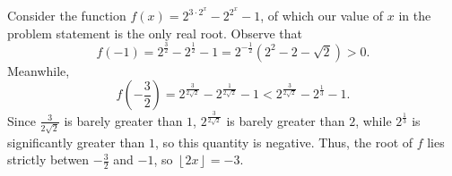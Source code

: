 Consider the function $f\left(x\right)=2^{3\cdot2^x}-2^{2^x}-1$, of which our value of $x$ in the problem statement is the only real root. Observe that \[f\left(-1\right)=2^{\frac{3}{2}}-2^{\frac{1}{2}}-1=2^{-\frac{1}{2}}\left(2^2-2-\sqrt{2}\right)>0.\] Meanwhile, \[f\left(-\frac{3}{2}\right)=2^{\frac{3}{2\sqrt{2}}}-2^{\frac{1}{2\sqrt{2}}}-1<2^{\frac{3}{2\sqrt{2}}}-2^{\frac{1}{3}}-1.\] Since $\frac{3}{2\sqrt{2}}$ is barely greater than $1$, $2^{\frac{3}{2\sqrt{2}}}$ is barely greater than $2$, while $2^{\frac{1}{3}}$ is significantly greater than $1$, so this quantity is negative. Thus, the root of $f$ lies strictly betwen $-\frac{3}{2}$ and $-1$, so $\left\lfloor2x\right\rfloor=\boxed{-3}$.